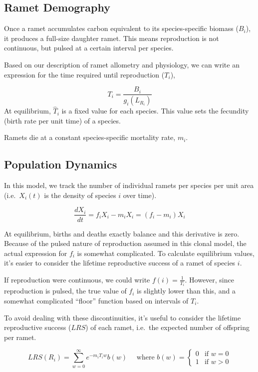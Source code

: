 \documentclass[
]{article}
\begin{document}
\subsection{Ramet Demography}\label{ramet-demography}

Once a ramet accumulates carbon equivalent to its species-specific
biomass (\(B_i\)), it produces a full-size daughter ramet. This means
reproduction is not continuous, but pulsed at a certain interval per
species.

Based on our description of ramet allometry and physiology, we can write
an expression for the time required until reproduction (\(T_i\)),

\[ T_i = \frac{B_i}{g_i(L_{R_i})} \] At equilibrium, \(\hat T_i\) is a
fixed value for each species. This value sets the fecundity (birth rate
per unit time) of a species.

Ramets die at a constant species-specific mortality rate, \(m_i\).

\subsection{Population Dynamics}\label{population-dynamics}

In this model, we track the number of individual ramets per species per
unit area (i.e.~\(X_i(t)\) is the density of species \(i\) over time).

\[\frac{dX_i}{dt} = f_i X_i - m_i X_i = (f_i - m_i)X_i\]

At equilibrium, births and deaths exactly balance and this derivative is
zero. Because of the pulsed nature of reproduction assumed in this
clonal model, the actual expression for \(f_i\) is somewhat complicated.
To calculate equilibrium values, it's easier to consider the lifetime
reproductive success of a ramet of species \(i\).

If reproduction were continuous, we could write
\(f(i) = \frac{1}{T_i}\). However, since reproduction is pulsed, the
true value of \(f_i\) is slightly lower than this, and a somewhat
complicated ``floor'' function based on intervals of \(T_i\).

To avoid dealing with these discontinuities, it's useful to consider the
lifetime reproductive success (\(LRS\)) of each ramet, i.e.~the expected
number of offspring per ramet.

\[LRS(R_i) = \sum_{w=0}^\infty e^{-m_i T_i w}b(w) \quad \text{ where } b(w) = \begin{cases}
   0 &\text{if } w = 0 \\
   1 &\text{if } w > 0
\end{cases}\]
\end{document}
